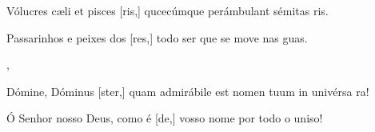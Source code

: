 {    {\item {}Vólucres cæli et pisces [ris,] qucecúmque perámbulant sémitas ris.~\Responsorium}%
        {\item {}Passarinhos e peixes dos [res,] todo ser que se move nas guas.~\Responsorium},
    {\item {}Dómine, Dóminus [ster,] quam admirábile est nomen tuum in univérsa ra!~\Responsorium}%
        {\item {}Ó Senhor nosso Deus, como é [de,] vosso nome por todo o uniso!~\Responsorium}
}
